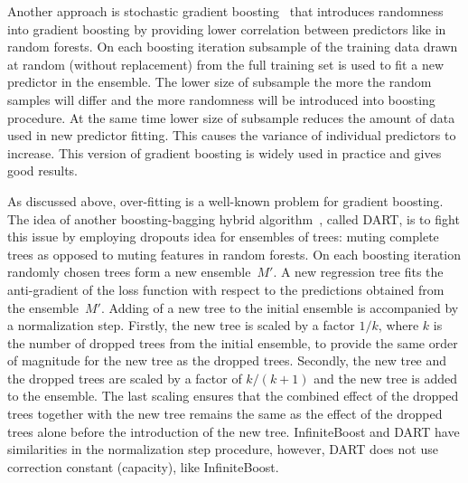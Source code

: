 Another approach is stochastic gradient boosting~\cite{key-sgb} that introduces randomness into gradient boosting by providing lower correlation between predictors like in random forests. 
On each boosting iteration subsample of the training data drawn at random (without replacement) from the full training set is used to fit a new predictor in the ensemble. 
The lower size of subsample the more the random samples will differ and the more randomness will be introduced into boosting procedure.
At the same time lower size of subsample reduces the amount of data used in new predictor fitting.
This causes the variance of individual predictors to increase.
This version of gradient boosting is widely used in practice and gives good results.

As discussed above, over-fitting is a well-known problem for gradient boosting. 
The idea of another boosting-bagging hybrid algorithm~\cite{key-dart}, called DART, is to fight this issue by employing dropouts idea for ensembles of trees: muting complete trees as opposed to muting features in random forests. 
On each boosting iteration randomly chosen trees form a new ensemble~$M'$. 
A new regression tree fits the anti-gradient of the loss function with respect to the predictions obtained from the ensemble~$M'$.
Adding of a new tree to the initial ensemble is accompanied by a normalization step.
Firstly, the new tree is scaled by a factor $1/k$, where $k$ is the number of dropped trees from the initial ensemble, to provide the same order of magnitude for the new tree as the dropped trees. 
Secondly, the new tree and the dropped trees are scaled by a factor of $k/(k+1)$ and the new tree is added to the ensemble.
The last scaling ensures that the combined effect of the dropped trees together with the new tree remains the
same as the effect of the dropped trees alone before the introduction of the new tree.
InfiniteBoost and DART have similarities in the normalization step procedure, however, DART does not use correction constant (capacity), like InfiniteBoost.

